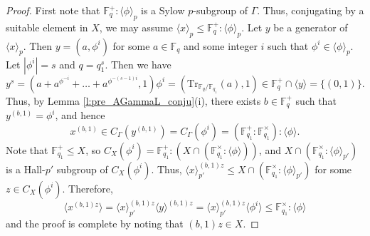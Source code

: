\documentclass[twoside,a4paper,reqno,11pt]{amsart}
\newcommand{\<}{\langle}
\renewcommand{\>}{\rangle}
\newcommand{\la}{\langle}
\newcommand{\ra}{\rangle}
\newcommand{\leqs}{\leqslant}
\theoremstyle{definition}
\begin{document}
	\begin{proof}
		First note that $\mathbb{F}_q^+{:}\la\phi\ra_p$ is a Sylow $p$-subgroup of $\Gamma$. Thus, conjugating by a suitable element in $X$, we may assume $\la x\ra_p\leqs \mathbb{F}_q^+{:}\la\phi\ra_p$. Let $y$ be a generator of $\la x\ra_p$. Then $y = (a,\phi^i)$ for some $a\in \mathbb{F}_q$ and some integer $i$ such that $\phi^i\in\la\phi\ra_p$. Let $|\phi^i| = s$ and $q = q_1^s$. Then we have
		\begin{equation*}
		y^s=(a+a^{\phi^{-i}}+\dots+a^{\phi^{-(s-1)i}},1)\phi^i=(\mathrm{Tr}_{\mathbb{F}_q/\mathbb{F}_{q_1}}(a),1)\in \mathbb{F}_q^{+}\cap \la y \ra=\{(0,1)\}.
		\end{equation*}
		Thus, by Lemma \ref{l:pre_AGammaL_conju}(i), there exists $b\in\mathbb{F}_q^+$ such that $y^{(b,1)} = \phi^i$, and hence
		\begin{equation*}
		x^{(b,1)}\in C_\Gamma(y^{(b,1)}) = C_\Gamma(\phi^i) = (\mathbb{F}_{q_1}^+{:}\mathbb{F}_{q_1}^\times){:}\la\phi\ra.
		\end{equation*}
		Note that $\mathbb{F}_{q_1}^+\leqslant X$, so $C_X(\phi^i)=\mathbb{F}_{q_1}^+{:}(X\cap(\mathbb{F}_{q_1}^\times{:}\la\phi\ra))$, and $X\cap (\mathbb{F}_{q_1}^{\times}{:}\la \phi \ra_{p'})$ is a Hall-$p'$ subgroup of $C_X(\phi^i)$.
		Thus,
		$\la x\ra_{p'}^{(b,1)z}\leqs X\cap (\mathbb{F}_{q_1}^\times{:}\la\phi\ra_{p'})$ for some $z\in C_X(\phi^i)$. Therefore,
		\begin{equation*}
		\la x^{(b,1)z}\ra = \la x\ra_{p'}^{(b,1)z}\la y\ra^{(b,1)z} =  \la x\ra_{p'}^{(b,1)z}\la\phi^i\ra \leqs \mathbb{F}_{q_1}^\times{:}\la\phi\ra
		\end{equation*}
		and the proof is complete by noting that $(b,1)z\in X$.
	\end{proof}
	
\end{document}
